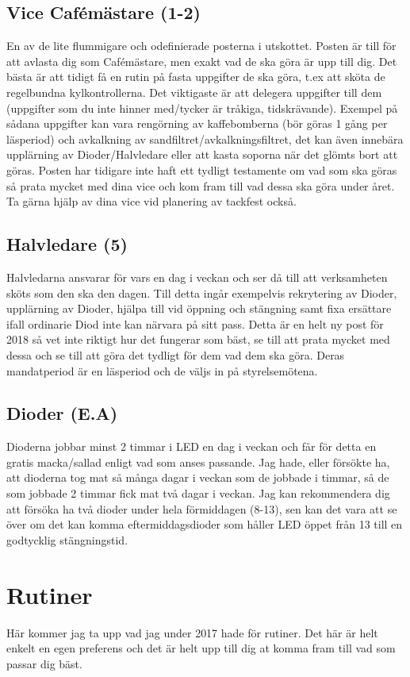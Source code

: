 \documentclass[10pt]{article}
\begin{document}
\subsection{Vice Cafémästare (1-2)}
En av de lite flummigare och odefinierade posterna i utskottet. Posten är till för att avlasta dig som Cafémästare, men exakt vad de ska göra är upp till dig. Det bästa är att tidigt få en rutin på fasta uppgifter de ska göra, t.ex att sköta de regelbundna kylkontrollerna. Det viktigaste är att delegera uppgifter till dem (uppgifter som du inte hinner med/tycker är tråkiga, tidskrävande). Exempel på sådana uppgifter kan vara rengörning av kaffebomberna (bör göras 1 gång per läsperiod) och avkalkning av sandfiltret/avkalkningsfiltret, det kan även innebära upplärning av Dioder/Halvledare eller att kasta soporna när det glömts bort att göras. Posten har tidigare inte haft ett tydligt testamente om vad som ska göras så prata mycket med dina vice och kom fram till vad dessa ska göra under året. Ta gärna hjälp av dina vice vid planering av tackfest också.

\subsection{Halvledare (5)}
Halvledarna ansvarar för vars en dag i veckan och ser då till att verksamheten sköts som den ska den dagen. Till detta ingår exempelvis rekrytering av Dioder, upplärning av Dioder, hjälpa till vid öppning och stängning samt fixa ersättare ifall ordinarie Diod inte kan närvara på sitt pass. Detta är en helt ny post för 2018 så vet inte riktigt hur det fungerar som bäst, se till att prata mycket med dessa och se till att göra det tydligt för dem vad dem ska göra. Deras mandatperiod är en läsperiod och de väljs in på styrelsemötena.

\subsection{Dioder (E.A)}
Dioderna jobbar minst 2 timmar i LED en dag i veckan och får för detta en gratis macka/sallad enligt vad som anses passande. Jag hade, eller försökte ha, att dioderna tog mat så många dagar i veckan som de jobbade i timmar, så de som jobbade 2 timmar fick mat två dagar i veckan. Jag kan rekommendera dig att försöka ha två dioder under hela förmiddagen (8-13), sen kan det vara att se över om det kan komma eftermiddagsdioder som håller LED öppet från 13 till en godtycklig stängningstid.

\section{Rutiner}
Här kommer jag ta upp vad jag under 2017 hade för rutiner. Det här är helt enkelt en egen preferens och det är helt upp till dig at komma fram till vad som passar dig bäst.
\end{document}
